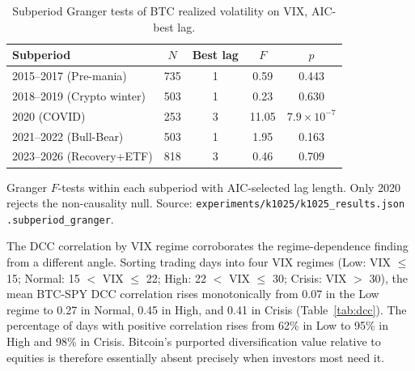 \documentclass[11pt,a4paper]{article}
\begin{document}
\begin{table}[H]
\centering
\caption{Subperiod Granger tests of BTC realized volatility on VIX, AIC-best lag.}
\label{tab:subperiod}
\begin{tabular}{lcccc}
\toprule
Subperiod & $N$ & Best lag & $F$ & $p$ \\
\midrule
2015--2017 (Pre-mania)         & 735 & 1 & 0.59  & 0.443 \\
2018--2019 (Crypto winter)     & 503 & 1 & 0.23  & 0.630 \\
2020 (COVID)                   & 253 & 3 & 11.05 & $7.9 \times 10^{-7}$ \\
2021--2022 (Bull-Bear)         & 503 & 1 & 1.95  & 0.163 \\
2023--2026 (Recovery+ETF)      & 818 & 3 & 0.46  & 0.709 \\
\bottomrule
\end{tabular}
\begin{flushleft}
\footnotesize Granger $F$-tests within each subperiod with AIC-selected lag length. Only 2020 rejects the non-causality null. Source: \texttt{experiments/k1025/k1025\_results.json .subperiod\_granger}.
\end{flushleft}
\end{table}

The DCC correlation by VIX regime corroborates the regime-dependence finding from a different angle. Sorting trading days into four VIX regimes (Low: VIX $\le$ 15; Normal: 15 $<$ VIX $\le$ 22; High: 22 $<$ VIX $\le$ 30; Crisis: VIX $>$ 30), the mean BTC-SPY DCC correlation rises monotonically from 0.07 in the Low regime to 0.27 in Normal, 0.45 in High, and 0.41 in Crisis (Table~\ref{tab:dcc}). The percentage of days with positive correlation rises from 62\% in Low to 95\% in High and 98\% in Crisis. Bitcoin's purported diversification value relative to equities is therefore essentially absent precisely when investors most need it.
\end{document}
